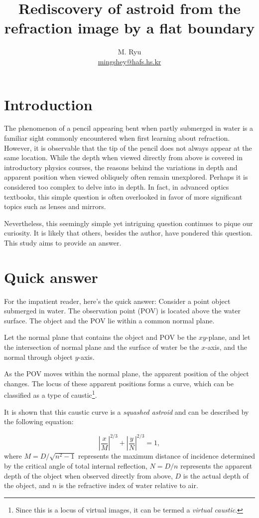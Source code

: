 \documentclass[twocolumn]{article}
\title{Rediscovery of astroid from the refraction image by a flat boundary}
\author{M. Ryu \\ {\href{mailto:mingshey@hafs.hs.kr}{mingshey@hafs.hs.kr}}}
\begin{document}
\maketitle
\section{Introduction}
The phenomenon of a pencil appearing bent when partly submerged in water is a 
familiar sight commonly encountered when first learning about refraction. 
However, it is observable that the tip of the pencil does not always appear 
at the same location. While the depth when viewed directly from above is 
covered in introductory physics courses, the reasons behind the variations 
in depth and apparent position when viewed obliquely often remain unexplored. 
Perhaps it is considered too complex to delve into in depth. In fact, in 
advanced optics textbooks, this simple question is often overlooked in favor 
of more significant topics such as lenses and mirrors.

Nevertheless, this seemingly simple yet intriguing question continues to 
pique our curiosity. It is likely that others, besides the author, have 
pondered this question. This study aims to provide an answer.

\section{Quick answer}
For the impatient reader, here's the quick answer:
Consider a point object submerged in water. The observation point (POV) is 
located above the water surface. The object and the POV lie within a common normal plane. 

Let the normal plane that contains the object and  POV be the $xy$-plane,
and let the intersection of  normal plane and the surface of water be the 
$x$-axis, and the normal through  object $y$-axis.

As the POV moves within the normal plane, the apparent position of the 
object changes. The locus of these apparent positions forms a curve, 
which can be classified as a type of caustic\footnote{Since this is a 
locus of virtual images, it can be termed a \emph{virtual caustic}.}. 

It is shown that this caustic curve is a \emph{squashed astroid}
and can be described by the following equation:

$$ \left| \dfrac{x}{M} \right| ^ {2/3} + \left| \dfrac{y}{N} \right| ^ {2/3} = 1,$$
where 
$M = D/\sqrt{n^2 - 1}$ represents the maximum distance of incidence determined 
by the critical angle of total internal reflection, 
$N = D/n$ represents the apparent depth of the object when observed directly 
from above,
$D$ is the actual depth of the object, and
$n$ is the refractive index of water relative to air.
\end{document}
